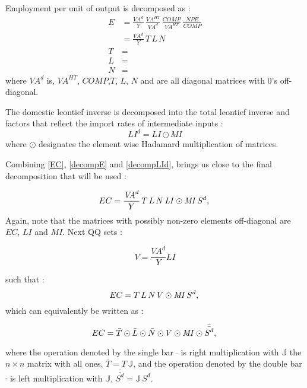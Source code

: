 \documentclass[12pt,english]{article}
\newcommand{\mli}[1]{\mathit{#1}}
\begin{document}
Employment per unit of output is decomposed as :
\begin{align}
	E &= \frac{\mli{VA^d}}{Y} \, \frac{\mli{VA}^{HT}}{\mli{VA}^d} \, \frac{\mli{COMP}}{\mli{VA^{HT}}} \, \frac{\mli{NPE}}{\mli{COMP}}   \label{decompE} \\ 
	&= \frac{\mli{VA^d}}{Y} \, T \, L \, N \\
	T &= \\
	L &= \\
	N &= 
\end{align}
where $\mli{VA^d}$ is, $\mli{VA}^{HT}$, $\mli{COMP}$,$T$, $L$, $N$ and are all diagonal matrices with 0's off-diagonal.

The domestic leontief inverse is decomposed into the total leontief inverse and factors that reflect the import rates of intermediate inputs : 
\begin{equation}
	LI^d = \mli{LI} \odot \mli{MI} \label{decompLId}
\end{equation}
where $\odot$ designates the element wise Hadamard multiplication of matrices.

Combining \ref{EC}, \ref{decompE} and \ref{decompLId}, brings us close to the final decomposition that will be used :

\begin{equation}
EC	= \frac{\mli{VA}^d}{Y} \, T \, L \, N \, \mli{LI} \odot \mli{MI} \, S^d,   \label{decompEC1} \\ 
\end{equation}
Again, note that the matrices with possibly non-zero elements off-diagonal are $EC$, $LI$ and $MI$. Next QQ sets :

$$ V = \frac{\mli{VA}^d}{Y} \mli{LI}$$ 

such that :
\begin{equation}
EC	= T \, L \, N \, V \odot \mli{MI} \, S^d,   \label{decompEC1} \\ 
\end{equation}
which can equivalently be written as :

\begin{equation}
EC	= \bar{T} \odot \bar{L} \odot \bar{N} \odot V \odot \mli{MI} \odot \bar{\bar{S^d}},   \label{decompEC2} \\ 
\end{equation}

where the operation denoted by the single bar $\bar{\ }$ is right multiplication with $\mathbb{J}$ the $n\times n$ matrix with all ones, $\bar{T} = T \, \mathbb{J}$, and the operation denoted by the double bar $\bar{\bar{\ }}$ is left multiplication with $\mathbb{J}$, $\bar{\bar{S^d}} = \mathbb{J} \, S^d$. 
\end{document}
